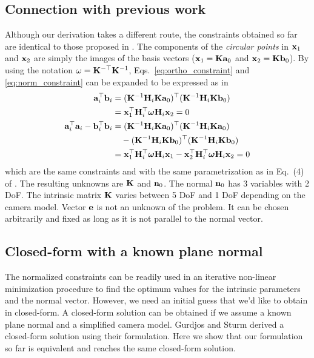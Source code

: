 \documentclass[10pt,twocolumn,letterpaper]{article}
\begin{document}
\subsection{Connection with previous work}
\label{sec:calib:connection}

Although our derivation takes a different route, the constraints obtained so far are identical to those proposed in \cite{bocquillon2006}. The components of the \emph{circular points} in \cite{bocquillon2006} $\mathbf{x}_1$ and $\mathbf{x}_2$ are simply the images of the basis vectors (\ie $\mathbf{x}_1=\mathbf{K} \mathbf{a}_0$ and $\mathbf{x}_2=\mathbf{K} \mathbf{b}_0$). By using the notation $\omega=\mathbf{K}^{-\top}\mathbf{K}^{-1}$, Eqs.~\eqref{eq:ortho_constraint} and \eqref{eq:norm_constraint} can be expanded to be expressed as in \cite{bocquillon2006}
%
\begin{align}
\mathbf{a}_i^\top \mathbf{b}_i &= (\mathbf{K}^{-1} \mathbf{H}_i \mathbf{K} \mathbf{a}_0)^\top (\mathbf{K}^{-1} \mathbf{H}_i \mathbf{K} \mathbf{b}_0) \notag \\
&= \mathbf{x}_1^\top \mathbf{H}_i^\top \bm{\omega} \mathbf{H}_i \mathbf{x}_2 = 0 
\\
\mathbf{a}_i^\top \mathbf{a}_i - \mathbf{b}_i^\top \mathbf{b}_i &= (\mathbf{K}^{-1} \mathbf{H}_i \mathbf{K} \mathbf{a}_0)^\top (\mathbf{K}^{-1} \mathbf{H}_i \mathbf{K} \mathbf{a}_0) \notag 
\\
&\quad - (\mathbf{K}^{-1} \mathbf{H}_i \mathbf{K} \mathbf{b}_0)^\top (\mathbf{K}^{-1} \mathbf{H}_i \mathbf{K} \mathbf{b}_0) \notag 
\\
&= \mathbf{x}_1^\top \mathbf{H}_i^\top \bm{\omega} \mathbf{H}_i \mathbf{x}_1 - \mathbf{x}_2^\top \mathbf{H}_i^\top \bm{\omega} \mathbf{H}_i \mathbf{x}_2 = 0 
\end{align}
which are the same constraints and with the same parametrization as in Eq.~(4) of \cite{bocquillon2006}. The resulting unknowns are $\mathbf{K}$ and $\mathbf{n}_0$. The normal $\mathbf{n}_0$ has 3 variables with 2 DoF. The intrinsic matrix $\mathbf{K}$ varies between 5 DoF and 1 DoF depending on the camera model. Vector $\mathbf{e}$ is not an unknown of the problem. It can be chosen arbitrarily and fixed as long as it is not parallel to the normal vector.


\subsection{Closed-form with a known plane normal}
\label{sec:calib:closed}

The normalized constraints can be readily used in an iterative non-linear minimization procedure to find the optimum values for the intrinsic parameters and the normal vector. However, we need an initial guess that we'd like to obtain in closed-form. A closed-form solution can be obtained if we assume a known plane normal and a simplified camera model. Gurdjos and Sturm \cite{gurdjos2003} derived a closed-form solution using their formulation. Here we show that our formulation so far is equivalent and reaches the same closed-form solution.
\end{document}
